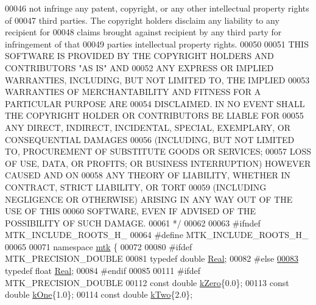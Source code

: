 \begin{DoxyCode}
00046 \textcolor{comment}{not infringe any patent, copyright, or any other intellectual property rights of}
00047 \textcolor{comment}{third parties. The copyright holders disclaim any liability to any recipient for}
00048 \textcolor{comment}{claims brought against recipient by any third party for infringement of that}
00049 \textcolor{comment}{parties intellectual property rights.}
00050 \textcolor{comment}{}
00051 \textcolor{comment}{THIS SOFTWARE IS PROVIDED BY THE COPYRIGHT HOLDERS AND CONTRIBUTORS "AS IS" AND}
00052 \textcolor{comment}{ANY EXPRESS OR IMPLIED WARRANTIES, INCLUDING, BUT NOT LIMITED TO, THE IMPLIED}
00053 \textcolor{comment}{WARRANTIES OF MERCHANTABILITY AND FITNESS FOR A PARTICULAR PURPOSE ARE}
00054 \textcolor{comment}{DISCLAIMED. IN NO EVENT SHALL THE COPYRIGHT HOLDER OR CONTRIBUTORS BE LIABLE FOR}
00055 \textcolor{comment}{ANY DIRECT, INDIRECT, INCIDENTAL, SPECIAL, EXEMPLARY, OR CONSEQUENTIAL DAMAGES}
00056 \textcolor{comment}{(INCLUDING, BUT NOT LIMITED TO, PROCUREMENT OF SUBSTITUTE GOODS OR SERVICES;}
00057 \textcolor{comment}{LOSS OF USE, DATA, OR PROFITS; OR BUSINESS INTERRUPTION) HOWEVER CAUSED AND ON}
00058 \textcolor{comment}{ANY THEORY OF LIABILITY, WHETHER IN CONTRACT, STRICT LIABILITY, OR TORT}
00059 \textcolor{comment}{(INCLUDING NEGLIGENCE OR OTHERWISE) ARISING IN ANY WAY OUT OF THE USE OF THIS}
00060 \textcolor{comment}{SOFTWARE, EVEN IF ADVISED OF THE POSSIBILITY OF SUCH DAMAGE.}
00061 \textcolor{comment}{*/}
00062 
00063 \textcolor{preprocessor}{#ifndef MTK\_INCLUDE\_ROOTS\_H\_}
00064 \textcolor{preprocessor}{#define MTK\_INCLUDE\_ROOTS\_H\_}
00065 
00071 \textcolor{keyword}{namespace }\hyperlink{namespacemtk}{mtk} \{
00072 
00080 \textcolor{preprocessor}{#ifdef MTK\_PRECISION\_DOUBLE}
00081 \textcolor{keyword}{typedef} \textcolor{keywordtype}{double} \hyperlink{group__c01-roots_gac080bbbf5cbb5502c9f00405f894857d}{Real};
00082 \textcolor{preprocessor}{#else}
\hypertarget{mtk__roots_8h_source_l00083}{}\hyperlink{group__c01-roots_gac080bbbf5cbb5502c9f00405f894857d}{00083} \textcolor{keyword}{typedef} \textcolor{keywordtype}{float} \hyperlink{group__c01-roots_gac080bbbf5cbb5502c9f00405f894857d}{Real};
00084 \textcolor{preprocessor}{#endif}
00085 
00111 \textcolor{preprocessor}{#ifdef MTK\_PRECISION\_DOUBLE}
00112 \textcolor{keyword}{const} \textcolor{keywordtype}{double} \hyperlink{group__c01-roots_ga59a451a5fae30d59649bcda274fea271}{kZero}\{0.0\};
00113 \textcolor{keyword}{const} \textcolor{keywordtype}{double} \hyperlink{group__c01-roots_ga26407c24d43b6b95480943340d285c71}{kOne}\{1.0\};
00114 \textcolor{keyword}{const} \textcolor{keywordtype}{double} \hyperlink{group__c01-roots_gaf39c2d851a2db744f4feb1c5ab3ec2cf}{kTwo}\{2.0\};

\end{DoxyCode}
